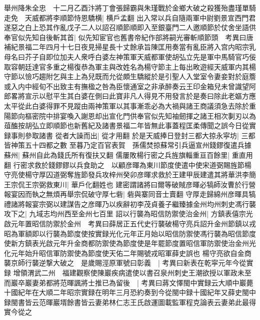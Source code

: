 舉州降朱全忠　十二月乙酉汴將丁會張歸霸與朱瑾戰於金鄉大破之殺獲殆盡瑾單騎走免　天威都將李順節恃恩驕横|{
	横戶孟翻}
出入常以兵自隨兩軍中尉劉景宣西門君遂惡之白上恐其作亂戊子二人以詔召順節順即入至銀臺門二人邀順節於仗舍坐語供奉官似先知自後斬其首|{
	似先知宦官也舊書帝紀作部將嗣光審斬順節頭　考異曰唐補紀景福二年四月十七日夜見掃星長十丈餘承旨陳匡用奏當有亂臣將入宫内昭宗乳母名曰芥子自即位加夫人衆呼白婆左神策軍天威都軍使胡弘立先是軍中馬騎官巧佞取容朝廷達官多重之楊復恭為軍主與改姓名為楊守節主上每出畋遊經天威軍内其楊守節以憸巧趨附乞與主上為兒既而允從頗生驕縱於是引聖人入堂室令妻妾對於庭簷或入内中經旬不出致主有撫楹之咎為臣懷通室之非承醉奏云王印金箱兒未曾識望阿郎畧將宣示以慰平生其白婆在側曰此寶非凡人得見不用發言於是奏曰除此老嫗方應太平從此白婆得罪不見蹤由兩神策軍以其事漸乖必為大禍與諸王商議須急去除於重陽節向樞密院中排宴喚入謝恩却出宣化門供奉官似先知袖劒揮之諸王相次剚刃以為葅醢按胡弘立即順節也新舊紀及諸書景福二年皆無此事蓋程匡柔傳聞之誤今日從實録事則參取諸書}
從者大譟而出|{
	從才用翻}
於是天威捧日登封三都大掠永寜坊|{
	三都皆神策五十四都之數}
至暮乃定百官表賀　孫儒焚掠蘇常引兵逼宣州錢鏐復遣兵據蘇州|{
	蘇州自此為錢氏所有復扶又翻}
儒屢敗楊行密之兵旌旗輜重亘百餘里|{
	重直用翻}
行密求救於錢鏐鏐以兵食助之　以顧彦暉為東川節度使遣中使宋道弼賜旌節楊守亮使楊守厚囚道弼奪旌節發兵攻梓州癸卯彦暉求救於王建甲辰建遣其將華洪李簡王宗侃王宗弼救東川|{
	華戶化翻姓也}
建密謂諸將曰爾等破賊彦暉必犒師汝曹於行營報宴因而執之無煩再舉宗侃破守厚七砦|{
	砦與寨同音士賣翻}
守厚走歸綿州彦暉具犒禮諸將報宴宗弼以建謀告之彦暉乃以疾辭初李茂貞養子繼臻據金州均州刺史馮行襲攻下之|{
	九域志均州西至金州七百里}
詔以行襲為昭信防禦使治金州|{
	方鎮表僖宗光啟元年置昭信防禦於金州　考異曰薛居正五代史行襲破楊守亮兵詔升金州節鎮以戎昭為軍額即以行襲為節度使按實録光化元年正月始以昭信防禦使馮行襲為昭信節度使新方鎮表光啟元年升金商都防禦使為節度使是年罷節度置昭信軍防禦使治金州光化元年始升昭信軍防禦使為節度使天佑二年賜號戎昭軍薛史誤也}
楊守亮欲自金商襲京師行襲逆撃大破之　是歲賜涇原軍號曰彰義　|{
	考異曰新表在乾寜元年今從實録}
增領渭武二州　福建觀察使陳巖疾病遣使以書召泉州刺史王潮欲授以軍政未至而巖卒巖妻弟都將范暉諷將士推已為留後　|{
	考異曰蔣文懌閩中實録云大順中巖薨十國紀年在大順二年昭宗實録在明年三月恐約奏到今從閩中録十國紀年又薛史閩中録閩書皆云范暉巖壻餘書皆云妻弟林仁志王氏啟運圖載監軍程克論表云妻弟此最得實今從之}


